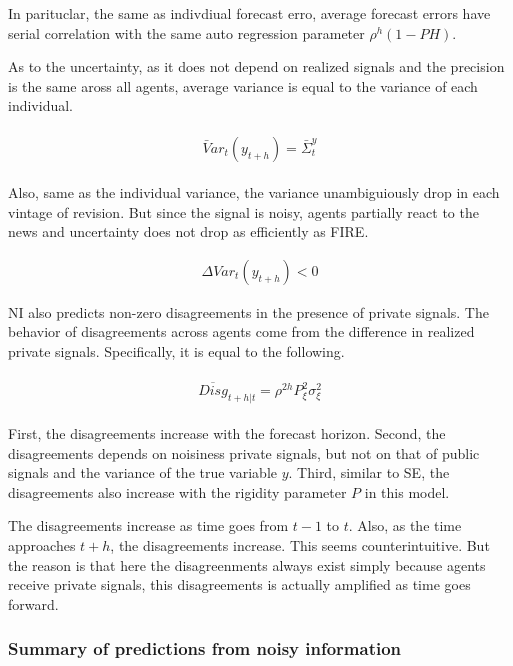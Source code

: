\documentclass[]{article}
\begin{document}
In parituclar, the same as indivdiual forecast erro, average forecast errors have serial correlation with the same auto regression parameter $\rho^h(1-PH)$. 

As to the uncertainty, as it does not depend on realized signals and the precision is the same aross all agents, average variance is equal to the variance of each individual. 

\begin{eqnarray}
\begin{aligned}
\bar Var_t (y_{t+h}) = \bar \Sigma^y_t
\end{aligned}
\end{eqnarray}

Also, same as the individual variance, the variance unambiguiously drop in each vintage of revision. But since the signal is noisy, agents partially react to the news and uncertainty does not drop as efficiently as FIRE. 

\begin{eqnarray}
\Delta Var_t(y_{t+h}) < 0 
\end{eqnarray}

NI also predicts non-zero disagreements in the presence of private signals. The behavior of disagreements across agents come from the difference in realized private signals. Specifically, it is equal to the following. 

\begin{eqnarray}
\begin{aligned}
\overline {Disg}_{t+h|t} = \rho^{2h} P^2_\xi \sigma^2_\xi  
\end{aligned}
\end{eqnarray}

First, the disagreements increase with the forecast horizon.  Second, the disagreements depends on noisiness private signals, but not on that of public signals and the variance of the true variable $y$. Third, similar to SE, the disagreements also increase with the rigidity parameter $P$ in this model.

The disagreements increase as time goes from $t-1$ to $t$. Also, as the time approaches $t+h$, the disagreements increase. This seems counterintuitive. But the reason is that here the disagreenments always exist simply because agents receive private signals, this disagreements is actually amplified as time goes forward. 


\subsubsection{Summary of predictions from noisy information}
\end{document}
